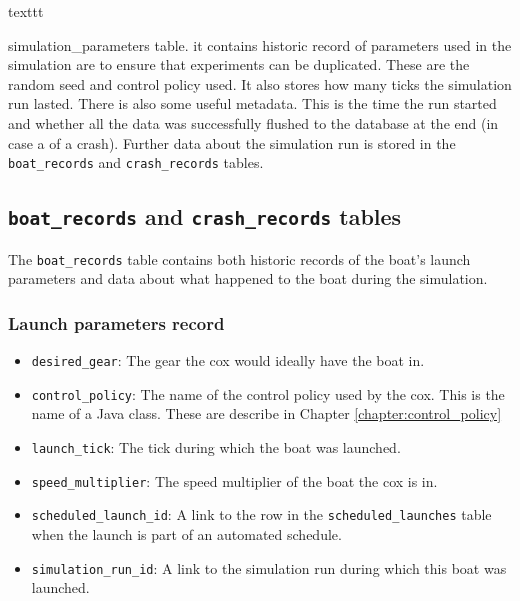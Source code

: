 texttt{simulation\_parameters table. it contains historic record of parameters
  used in the simulation are to ensure that experiments can be
  duplicated. These are the random seed and control policy used. It
  also stores how many ticks the simulation run lasted. There is also
  some useful metadata. This is the time the run started and whether
  all the data was successfully flushed to the database at the end (in
  case a of a crash). Further data about the simulation run is stored
  in the \texttt{boat\_records} and \texttt{crash\_records} tables.

\subsection{\texttt{boat\_records} and \texttt{crash\_records} tables}
The \texttt{boat\_records} table contains both historic records of the
boat's launch parameters and data about what happened to the boat
during the simulation.

\subsubsection{Launch parameters record}

\begin{itemize}
  \item{\texttt{desired\_gear}:} The gear the cox would ideally have the boat
    in.
  \item{\texttt{control\_policy}:} The name of the control policy used by the
    cox. This is the name of a Java class. These are describe in Chapter \ref{chapter:control_policy}
  \item{\texttt{launch\_tick}:} The tick during which the boat was launched.
  \item{\texttt{speed\_multiplier}:} The speed multiplier of the boat the cox
    is in.
  \item{\texttt{scheduled\_launch\_id}:} A link to the row in the
    \texttt{scheduled\_launches} table when the launch is part of an
    automated schedule.
  \item{\texttt{simulation\_run\_id}:} A link to the simulation run during
    which this boat was launched.
\end{itemize}

}
